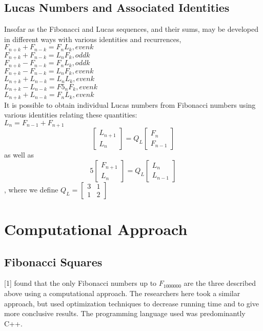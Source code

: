 \documentclass[11pt]{article}
\begin{document}
\subsection{Lucas Numbers and Associated Identities}
Insofar as the Fibonacci and Lucas sequences, and their sums, may be developed in different ways with various identities and recurrences, 
$F_{n+k} + F_{n-k} = F_{n}L_{k}, even k$\\
$F_{n+k} + F_{n-k} = L_{n}F_{k}, odd k$\\$F_{n+k} - F_{n-k} = F_{n}L_{k}, odd k$ \\ $F_{n+k} - F_{n-k} = L_{n}F_{k}, even k$ \\ $L_{n+k} + L_{n-k} = L_{n}L_{k}, even k$ \\ $L_{n+k} - L_{n-k} = F5_{n}F_{k}, even k$ \\ $L_{n+k} + L_{n-k} = F_{n}L_{k}, even k$\\ It is possible to obtain individual Lucas numbers from Fibonacci numbers using various identities relating these quantities:\\$L_{n} = F_{n-1} + F_{n+1}$ \\ 
\[
\begin{bmatrix}
L_{n+1} \\
L_{n}
\end{bmatrix} = Q_{L} \begin{bmatrix} F_{n} \\ F_{n-1}\end{bmatrix}
\] 
as well as \\
\[
5\begin{bmatrix}
F_{n+1} \\
L_{n}
\end{bmatrix} = Q_{L} \begin{bmatrix} L_{n} \\ L_{n-1}\end{bmatrix}
\] , where we define $Q_{L} = \begin{bmatrix} 3 & 1 \\ 1 & 2 \end{bmatrix}$

\section{Computational Approach}
\subsection{Fibonacci Squares}
[1] found that the only Fibonacci numbers up to $F_{1000000}$ are the three described above using a computational approach. The researchers here took a similar approach, but used optimization techniques to decrease running time and to give more conclusive results. The programming language used was predominantly C++.
\end{document}
